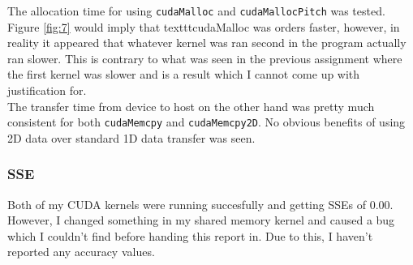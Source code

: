 \documentclass[12pt]{article}
\begin{document}
The allocation time for using \texttt{cudaMalloc} and \texttt{cudaMallocPitch} was tested. Figure \ref{fig:7} would imply that texttt{cudaMalloc} was orders faster, however, in reality it appeared that whatever kernel was ran second in the program actually ran slower. This is contrary to what was seen in the previous assignment where the first kernel was slower and is a result which I cannot come up with justification for.\\
The transfer time from device to host on the other hand was pretty much consistent for both \texttt{cudaMemcpy} and \texttt{cudaMemcpy2D}. No obvious benefits of using 2D data over standard 1D data transfer was seen.
\subsubsection*{SSE}
Both of my CUDA kernels were running succesfully and getting SSEs of $0.00$. However, I changed something in my shared memory kernel and caused a bug which I couldn't find before handing this report in. Due to this, I haven't reported any accuracy values.
\pagebreak
\end{document}
